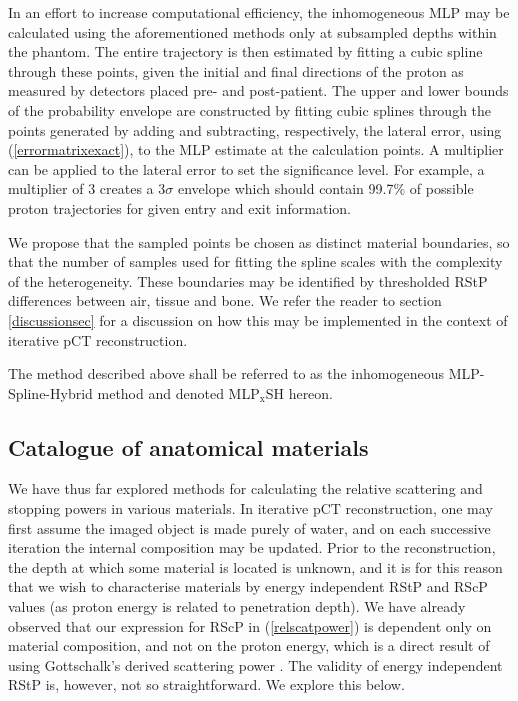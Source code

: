 \documentclass[preprint,times]{elsarticle}
\newcommand{\Eqn}[1]{(#1)} %
\begin{document}
In an effort to increase computational efficiency, the inhomogeneous MLP may be calculated using the aforementioned methods only at subsampled depths within the phantom. The entire trajectory is then estimated by fitting a cubic spline through these points, given the initial and final directions of the proton as measured by detectors placed pre- and post-patient. The upper and lower bounds of the probability envelope are constructed by fitting cubic splines through the points generated by adding and subtracting, respectively, the lateral error, using \Eqn{\ref{errormatrixexact}}, to the MLP estimate at the calculation points. A multiplier can be applied to the lateral error to set the significance level. For example, a multiplier of 3 creates a 3$\sigma$ envelope which should contain 99.7\% of possible proton trajectories for given entry and exit information.

We propose that the sampled points be chosen as distinct material boundaries, so that the number of samples used for fitting the spline scales with the complexity of the heterogeneity. These boundaries may be identified by thresholded RStP differences between air, tissue and bone. We refer the reader to section \ref{discussionsec} for a discussion on how this may be implemented in the context of iterative pCT reconstruction.

The method described above shall be referred to as the inhomogeneous MLP-Spline-Hybrid method and denoted MLP$_\mathrm{x}$SH hereon.

\subsection{Catalogue of anatomical materials}
\label{cataloguesec}

We have thus far explored methods for calculating the relative scattering and stopping powers in various materials. In iterative pCT reconstruction, one may first assume the imaged object is made purely of water, and on each successive iteration the internal composition may be updated. Prior to the reconstruction, the depth at which some material is located is unknown, and it is for this reason that we wish to characterise materials by energy independent RStP and RScP values (as proton energy is related to penetration depth). We have already observed that our expression for RScP in \Eqn{\ref{relscatpower}} is dependent only on material composition, and not on the proton energy, which is a direct result of using Gottschalk's derived scattering power \citep{gottschalkRadioProtons}. The validity of energy independent RStP is, however, not so straightforward. We explore this below.
\end{document}
